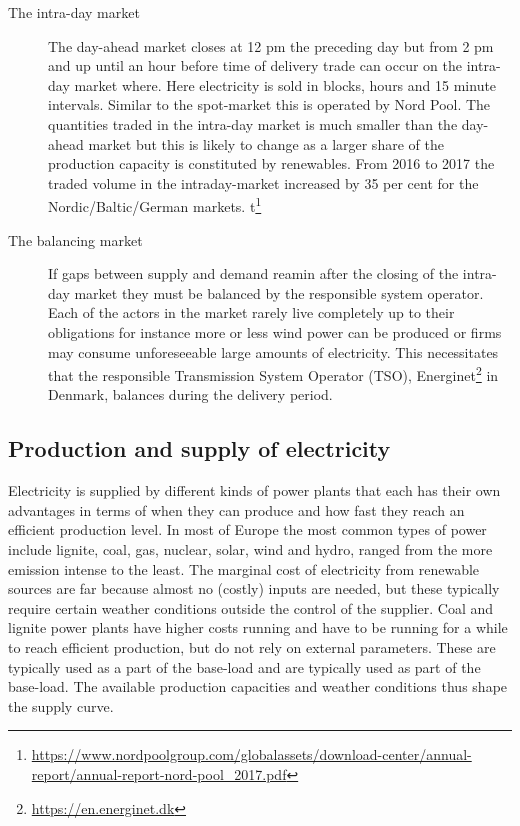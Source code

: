 \begin{description}
    \item [The intra-day market]
     The day-ahead market closes at 12 pm the preceding day but from 2 pm and up until an hour before time of delivery trade can occur on the intra-day market where. Here electricity is sold in blocks, hours and 15 minute intervals. Similar to the spot-market this is operated by Nord Pool. The quantities traded in the intra-day market is much smaller than the day-ahead market but this is likely to change as a larger share of the production capacity is constituted by renewables. From 2016 to 2017 the traded volume in the intraday-market increased by 35 per cent for the Nordic/Baltic/German markets.  t\footnote{\url{https://www.nordpoolgroup.com/globalassets/download-center/annual-report/annual-report-nord-pool_2017.pdf}}  %

    \item [The balancing market]
    If gaps between supply and demand reamin after the closing of the intra-day market they must be balanced by the responsible system operator. Each of the actors in the market rarely live completely up to their obligations for instance more or less wind power can be produced or firms may consume unforeseeable large amounts of electricity. This necessitates that the responsible Transmission System Operator (TSO), Energinet\footnote{\url{https://en.energinet.dk}} in Denmark, balances during the delivery period. %


\end{description}


\subsection{Production and supply of electricity}
\label{subsec:t_production}
Electricity is supplied by different kinds of power plants that each has their own advantages in terms of when they can produce and how fast they reach an efficient production level. In most of Europe the most common types of power include lignite, coal, gas, nuclear, solar, wind and hydro, ranged from the more emission intense to the least. The marginal cost of electricity from renewable sources are far because almost no (costly) inputs are needed, but these typically require certain weather conditions outside the control of the supplier. Coal and lignite power plants have higher costs running and have to be running for a while to reach efficient production, but do not rely on external parameters. These are typically used as a part of the base-load  and are typically used as part of the base-load. The available production capacities and weather conditions thus shape the supply curve.
\medskip 

